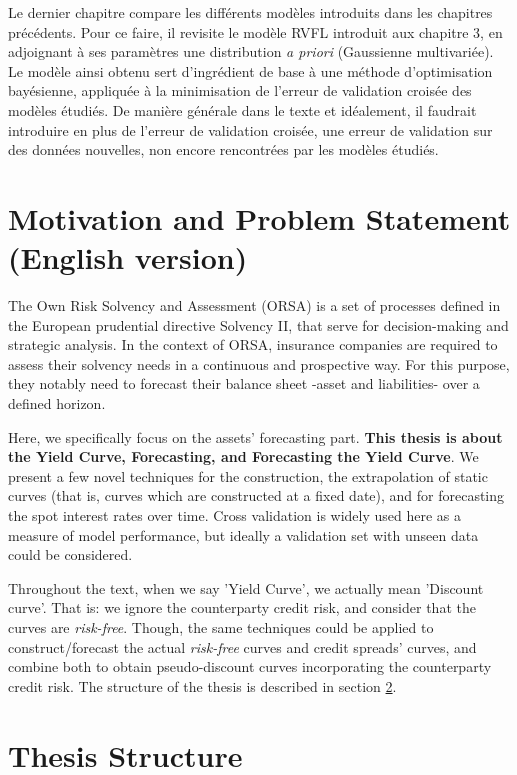 Le dernier chapitre compare les différents modèles introduits dans les chapitres précédents. Pour ce faire, il revisite le modèle RVFL introduit aux chapitre 3, en adjoignant à ses paramètres une distribution \textit{a priori} (Gaussienne multivariée). Le modèle ainsi obtenu sert d'ingrédient de base à une méthode d'optimisation bayésienne, appliquée à la minimisation de l'erreur de validation croisée des modèles étudiés. De manière générale dans le texte et idéalement, il faudrait introduire en plus de l'erreur de validation croisée, une erreur de validation sur des données nouvelles, non encore rencontrées par les modèles étudiés.   


\section{Motivation and Problem Statement (English version)}
\label{sec:intro:motivation}

The Own Risk Solvency and Assessment (ORSA) is a set of processes defined in the European prudential directive Solvency II, that serve for decision-making and strategic analysis. In the context of ORSA, insurance companies are required to assess their solvency needs in a continuous and prospective way. For this purpose, they notably need to forecast their balance sheet -asset and liabilities- over a defined horizon.

Here, we specifically focus on the assets' forecasting part. \textbf{This thesis is about the Yield Curve, Forecasting, and Forecasting the Yield Curve}. We present a few novel techniques for the construction, the extrapolation of static curves (that is, curves which are constructed at a fixed date), and for forecasting the spot interest rates over time. Cross validation is widely used here as a measure of model performance, but ideally a validation set with unseen data could be considered. 

Throughout the text, when we say 'Yield Curve', we actually mean 'Discount curve'. That is: we ignore the counterparty credit risk, and consider that the curves are \textit{risk-free}. Though, the same techniques could be applied to construct/forecast the actual \textit{risk-free} curves and credit spreads' curves, and combine both to obtain pseudo-discount curves incorporating the counterparty credit risk. The structure of the thesis is described in section \ref{sec:intro:structure}.

\section{Thesis Structure}
\label{sec:intro:structure}


